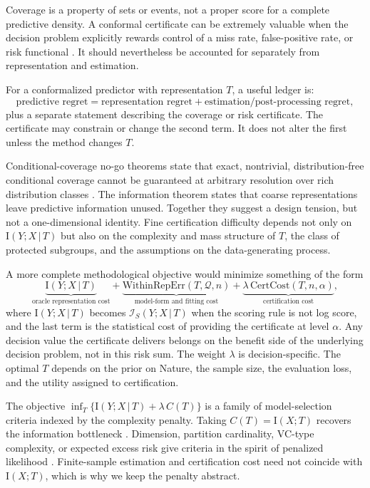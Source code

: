 \documentclass[11pt]{article}
\theoremstyle{remark}
\newcommand{\I}{\mathrm{I}}
\newcommand{\given}{\,|\,}
\begin{document}
Coverage is a property of sets or events, not a proper score for a complete predictive density.
A conformal certificate can be extremely valuable when the decision problem explicitly rewards
control of a miss rate, false-positive rate, or risk functional
\citep{vovk2005algorithmic,angelopoulos2021uncertainty,bates2021distribution,angelopoulos2024conformalrisk}.
It should nevertheless be accounted for separately from representation and estimation.

For a conformalized predictor with representation $T$, a useful ledger is:
\[
\text{predictive regret}=\text{representation regret}+\text{estimation/post-processing regret},
\]
plus a separate statement describing the coverage or risk certificate. The certificate may
constrain or change the second term. It does not alter the first unless the method changes
$T$.

Conditional-coverage no-go theorems state that exact, nontrivial, distribution-free conditional
coverage cannot be guaranteed at arbitrary resolution over rich distribution classes
\citep{lei2014distribution,barber2021limits}. The information theorem states that coarse
representations leave predictive information unused. Together they suggest a design tension, but
not a one-dimensional identity. Fine certification difficulty depends not only on
$\I(Y;X\given T)$ but also on the complexity and mass structure of $T$, the class of protected
subgroups, and the assumptions on the data-generating process.

A more complete methodological objective would minimize something of the form
\[
\underbrace{\I(Y;X\given T)}_{\text{oracle representation cost}}
+\underbrace{\mathrm{WithinRepErr}(T,\mathcal Q,n)}_{\text{model-form and fitting cost}}
+\underbrace{\lambda\,\mathrm{CertCost}(T,n,\alpha)}_{\text{certification cost}},
\]
where $\I(Y;X\given T)$ becomes $\mathcal I_S(Y;X\given T)$ when the scoring rule is not
log score, and the last term is the statistical cost of providing the certificate at level
$\alpha$. Any decision value the certificate delivers belongs on the benefit side of the
underlying decision problem, not in this risk sum. The weight $\lambda$ is
decision-specific. The optimal $T$ depends on the prior on Nature, the sample size, the
evaluation loss, and the utility assigned to certification.

The objective $\inf_T\{\I(Y;X\given T)+\lambda\,C(T)\}$ is a family of model-selection
criteria indexed by the complexity penalty. Taking $C(T)=\I(X;T)$ recovers the information
bottleneck \citep{tishby1999information}. Dimension, partition cardinality, VC-type
complexity, or expected excess risk give criteria in the spirit of penalized likelihood
\citep{akaike1974new}. Finite-sample estimation and certification cost need not coincide with
$\I(X;T)$, which is why we keep the penalty abstract.
\end{document}
